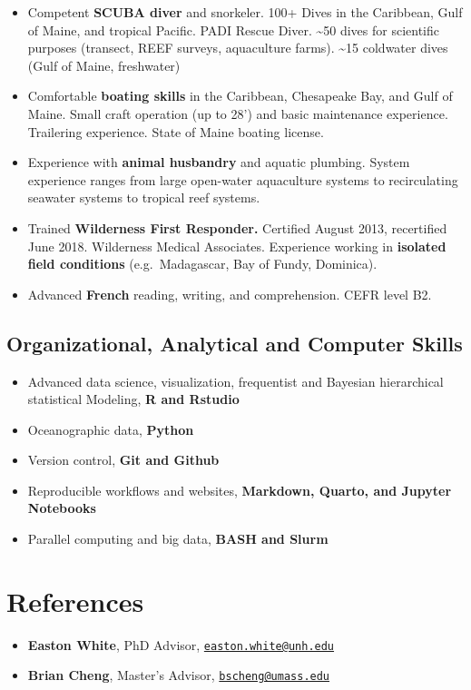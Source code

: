 \documentclass[11pt,a4paper,]{awesome-cv}
\providecommand{\tightlist}{%
	\setlength{\itemsep}{0pt}\setlength{\parskip}{0pt}}
\begin{document}
\begin{itemize}
\item
  Competent \textbf{SCUBA diver} and snorkeler. 100+ Dives in the
  Caribbean, Gulf of Maine, and tropical Pacific. PADI Rescue Diver.
  \textasciitilde50 dives for scientific purposes (transect, REEF
  surveys, aquaculture farms). \textasciitilde15 coldwater dives (Gulf
  of Maine, freshwater)
\item
  Comfortable \textbf{boating skills} in the Caribbean, Chesapeake Bay,
  and Gulf of Maine. Small craft operation (up to 28') and basic
  maintenance experience. Trailering experience. State of Maine boating
  license.
\item
  Experience with \textbf{animal husbandry} and aquatic plumbing. System
  experience ranges from large open-water aquaculture systems to
  recirculating seawater systems to tropical reef systems.
\item
  Trained \textbf{Wilderness First Responder.} Certified August 2013,
  recertified June 2018. Wilderness Medical Associates. Experience
  working in \textbf{isolated field conditions} (e.g.~Madagascar, Bay of
  Fundy, Dominica).
\item
  Advanced \textbf{French} reading, writing, and comprehension. CEFR
  level B2.
\end{itemize}

\subsection{Organizational, Analytical and Computer
Skills}\label{organizational-analytical-and-computer-skills}

\begin{itemize}
\tightlist
\item
  Advanced data science, visualization, frequentist and Bayesian
  hierarchical statistical Modeling, \textbf{R and Rstudio}
\item
  Oceanographic data, \textbf{Python}
\item
  Version control, \textbf{Git and Github}
\item
  Reproducible workflows and websites, \textbf{Markdown, Quarto, and
  Jupyter Notebooks}
\item
  Parallel computing and big data, \textbf{BASH and Slurm}
\end{itemize}

\section{References}\label{references}

\begin{itemize}
\tightlist
\item
  \textbf{Easton White}, PhD Advisor,
  \href{mailto:easton.white@unh.edu}{\nolinkurl{easton.white@unh.edu}}
\item
  \textbf{Brian Cheng}, Master's Advisor,
  \href{mailto:bscheng@umass.edu}{\nolinkurl{bscheng@umass.edu}}
\end{itemize}


\label{LastPage}~
\end{document}
